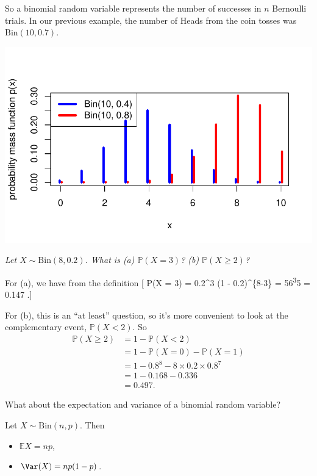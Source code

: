 \documentclass[
  letterpaper,
  DIV=11,
  numbers=noendperiod]{scrreprt}
\providecommand{\tightlist}{%
  \setlength{\itemsep}{0pt}\setlength{\parskip}{0pt}}\usepackage{longtable,booktabs,array}
\theoremstyle{remark}
\begin{document}
So a binomial random variable represents the number of successes in
\(n\) Bernoulli trials. In our previous example, the number of Heads
from the coin tosses was \(\text{Bin}(10, 0.7)\).

\includegraphics{sections/L11-binomial-geometric_files/figure-pdf/binom-pic-1.pdf}

\emph{Let \(X \sim \mathrm{Bin}(8, 0.2)\). What is (a)
\(\mathbb P(X = 3)\)? (b) \(\mathbb P(X \geq 2)\)?}

For (a), we have from the definition {[} \mathbb P(X = 3) = 
0.2\^{}3 (1 - 0.2)\^{}\{8-3\} =
56\textsuperscript{3}5 = 0.147 .{]}

For (b), this is an ``at least'' question, so it's more convenient to
look at the complementary event, \(\mathbb P(X < 2)\). So \begin{align*}
\mathbb P(X \geq 2) &= 1 - \mathbb P(X < 2) \\
  &= 1 - \mathbb P(X = 0) - \mathbb P(X = 1) \\
  &= 1 - 0.8^8 - 8\times 0.2 \times 0.8^7 \\
  &= 1 - 0.168 - 0.336 \\
  & = 0.497 .
\end{align*}

What about the expectation and variance of a binomial random variable?

Let \(X \sim \text{Bin}(n, p)\). Then

\begin{itemize}
\tightlist
\item
  \(\mathbb EX = np\),
\item
  \(\Var(X) =np(1-p)\).
\end{itemize}
\end{document}
